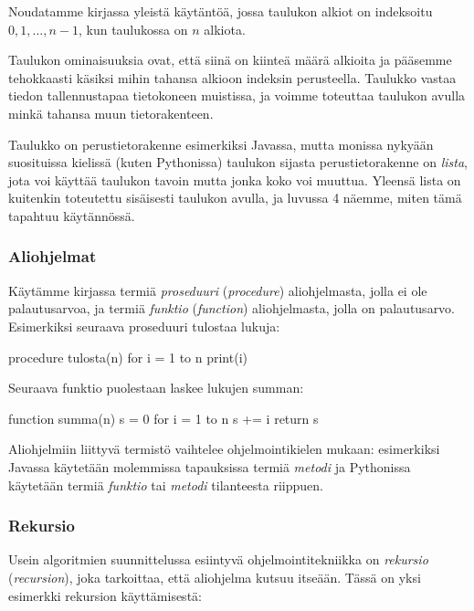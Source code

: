 Noudatamme kirjassa yleistä käytäntöä, jossa taulukon alkiot on indeksoitu
$0,1,\dots,n-1$, kun taulukossa on $n$ alkiota.

Taulukon ominaisuuksia ovat, että siinä on kiinteä määrä alkioita ja
pääsemme tehokkaasti käsiksi mihin tahansa alkioon indeksin perusteella.
Taulukko vastaa tiedon tallennustapaa tietokoneen muistissa,
ja voimme toteuttaa taulukon avulla minkä tahansa muun tietorakenteen.


Taulukko on perustietorakenne esimerkiksi Javassa,
mutta monissa nykyään suosituissa kielissä (kuten Pythonissa)
taulukon sijasta perustietorakenne on \emph{lista},
jota voi käyttää taulukon tavoin mutta jonka koko voi muuttua.
Yleensä lista on kuitenkin toteutettu sisäisesti taulukon avulla,
ja luvussa 4 näemme, miten tämä tapahtuu käytännössä.

\subsubsection{Aliohjelmat}


Käytämme kirjassa termiä \emph{proseduuri} (\emph{procedure})
aliohjelmasta, jolla ei ole palautusarvoa,
ja termiä \emph{funktio} (\emph{function}) aliohjelmasta, jolla on palautusarvo.
Esimerkiksi seuraava proseduuri tulostaa lukuja:

\begin{code}
procedure tulosta(n)
    for i = 1 to n
        print(i)
\end{code}

Seuraava funktio puolestaan laskee lukujen summan:

\begin{code}
function summa(n)
    s = 0
    for i = 1 to n
        s += i
    return s
\end{code}

Aliohjelmiin liittyvä termistö vaihtelee ohjelmointikielen mukaan:
esimerkiksi Javassa käytetään molemmissa tapauksissa termiä
\emph{metodi} ja Pythonissa käytetään termiä \emph{funktio} tai
\emph{metodi} tilanteesta riippuen.

\subsubsection{Rekursio}


Usein algoritmien suunnittelussa esiintyvä ohjelmointitekniikka on
\emph{rekursio} (\emph{recursion}),
joka tarkoittaa, että aliohjelma kutsuu itseään.
Tässä on yksi esimerkki rekursion käyttämisestä:

